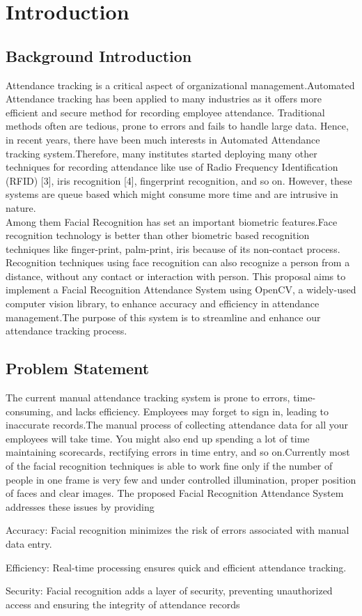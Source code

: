 \chapter{Introduction}


        \section{Background Introduction}
        Attendance tracking is a critical aspect of organizational management.Automated Attendance tracking has been applied to many industries as it offers  more efficient 
and secure method for recording employee attendance.
 Traditional methods often are tedious, prone to errors and fails to handle large data. Hence, in
 recent years, there have been much interests in Automated Attendance tracking system.Therefore,  many  institutes  started deploying  many  other  techniques  for  recording  attendance like  use of  Radio Frequency  Identification (RFID)  [3], iris recognition [4], fingerprint recognition, and so on. However, these  systems  are queue  based which  might  consume  more time and are intrusive in nature.
 \\
 Among them Facial Recognition has set an important biometric features.Face recognition
technology is better than other biometric based recognition
techniques like finger-print, palm-print, iris because of its
non-contact process. Recognition techniques using face
recognition can also recognize a person from a distance,
without any contact or interaction with person.
 This proposal aims to implement a Facial Recognition Attendance System using OpenCV, a widely-used computer vision library, to enhance accuracy and efficiency in attendance management.The purpose of this system is to streamline and enhance our attendance 
tracking process.
 
        \section{Problem Statement}
         The current manual attendance tracking system is prone to errors, time-consuming, and lacks efficiency. Employees may forget to sign in, leading to inaccurate records.The manual process of collecting attendance data for all your employees will  take time. You might also end up spending a lot of time maintaining scorecards, rectifying errors in time entry, and so on.Currently most of the facial recognition techniques is
able to work fine only if the number of people in one frame
is very few and under controlled illumination, proper position of faces and clear images. The proposed Facial Recognition Attendance System addresses these issues by providing

Accuracy: Facial recognition minimizes the risk of errors associated with manual data entry.

Efficiency: Real-time processing ensures quick and efficient attendance tracking.

Security: Facial recognition adds a layer of security, preventing unauthorized access and ensuring the integrity of attendance records
     
